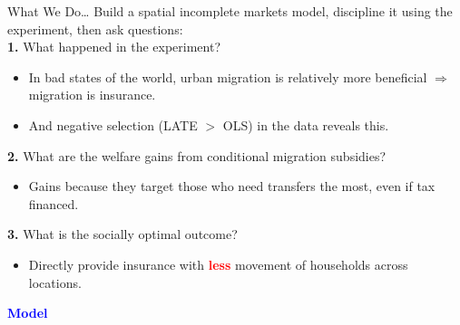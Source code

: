 \documentclass[9pt,pdftex,aspectratio=1610]{beamer}
\theoremstyle{definition}
\begin{document}
\begin{frame}[t]{What We Do\ldots}
Build a spatial incomplete markets model, discipline it using the experiment, then ask questions:\\
\bigskip
\textbf{1.} What happened in the experiment?
\begin{itemize}
\smallskip
\item In bad states of the world, urban migration is relatively more beneficial $\Rightarrow$ migration is insurance.
\smallskip
\item And negative selection (LATE $>$ OLS) in the data reveals this.
\end{itemize}
\bigskip
\textbf{2.} What are the welfare gains from conditional migration subsidies? \\
\begin{itemize}
\smallskip
\item Gains because they target those who need transfers the most, even if tax financed.
\smallskip
\end{itemize}
\bigskip
\textbf{3.} What is the socially optimal outcome? \\
\begin{itemize}
\smallskip
\item Directly provide insurance with \textcolor{red}{\textbf{less}} movement of households across locations.
\smallskip
\end{itemize}
\end{frame}



\begin{frame}
\vspace{1cm}
\begin{center}
\textbf{\textcolor{blue}{\large Model}}
\end{center}
\end{frame}

\end{document}
